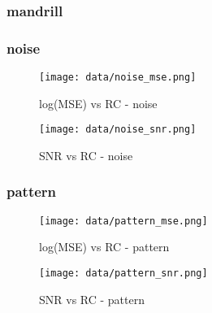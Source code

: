 \documentclass[12pt,a4paper]{article}
\begin{document}
\subsubsection{mandrill}

\subsubsection{noise}
\hspace*{-2.5em}
\begin{minipage}{0.5\textwidth}
        \centering
        \begin{figure}[H]
    \centering
    \texttt{[image: data/noise\_mse.png]}
    \caption{log(MSE) vs RC - noise}
    
\end{figure}
\end{minipage}\hfill
    \begin{minipage}{0.5\textwidth}
        \centering
        \begin{figure}[H]
    \centering
    \texttt{[image: data/noise\_snr.png]}
    \caption{SNR vs RC - noise}
    
\end{figure}
\end{minipage}

\subsubsection{pattern}
\hspace*{-2.5em}
\begin{minipage}{0.5\textwidth}
        \centering
        \begin{figure}[H]
    \centering
    \texttt{[image: data/pattern\_mse.png]}
    \caption{log(MSE) vs RC - pattern}
    
\end{figure}
\end{minipage}\hfill
    \begin{minipage}{0.5\textwidth}
        \centering
        \begin{figure}[H]
    \centering
    \texttt{[image: data/pattern\_snr.png]}
    \caption{SNR vs RC - pattern}
    
\end{figure}
\end{minipage}
\end{document}
